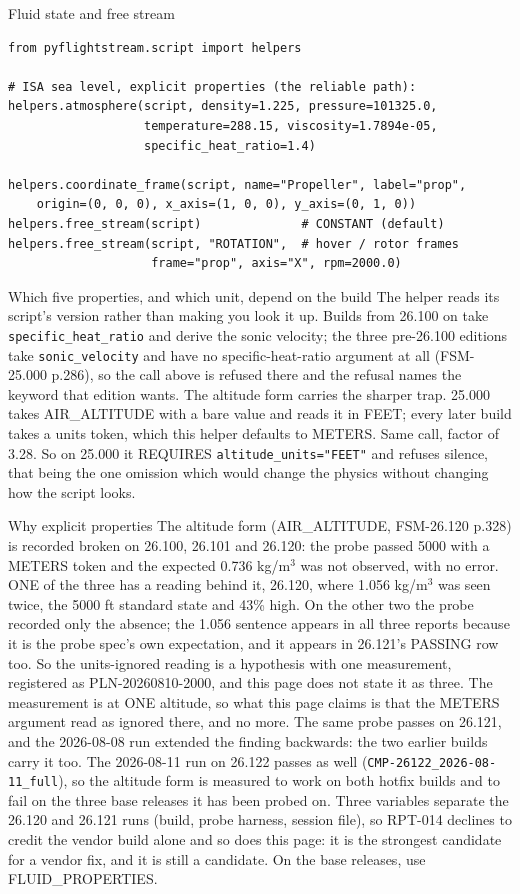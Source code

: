 \documentclass[aspectratio=169,10pt]{beamer}
\newcommand{\code}[1]{\texttt{\small #1}}
\begin{document}
\begin{frame}{Fluid state and free stream}
\begin{lstlisting}
from pyflightstream.script import helpers

# ISA sea level, explicit properties (the reliable path):
helpers.atmosphere(script, density=1.225, pressure=101325.0,
                   temperature=288.15, viscosity=1.7894e-05,
                   specific_heat_ratio=1.4)

helpers.coordinate_frame(script, name="Propeller", label="prop",
    origin=(0, 0, 0), x_axis=(1, 0, 0), y_axis=(0, 1, 0))
helpers.free_stream(script)              # CONSTANT (default)
helpers.free_stream(script, "ROTATION",  # hover / rotor frames
                    frame="prop", axis="X", rpm=2000.0)
\end{lstlisting}
  \begin{block}{Which five properties, and which unit, depend on the build}
    The helper reads its script's version rather than making you look it up. Builds from 26.100 on take \code{specific\_heat\_ratio} and derive the sonic velocity; the three pre-26.100 editions take \code{sonic\_velocity} and have no specific-heat-ratio argument at all (FSM-25.000 p.286), so the call above is refused there and the refusal names the keyword that edition wants.
    The altitude form carries the sharper trap. 25.000 takes AIR\_ALTITUDE with a bare value and reads it in FEET; every later build takes a units token, which this helper defaults to METERS. Same call, factor of 3.28. So on 25.000 it REQUIRES \code{altitude\_units="FEET"} and refuses silence, that being the one omission which would change the physics without changing how the script looks.
  \end{block}
  \begin{alertblock}{Why explicit properties}
    \small The altitude form (AIR\_ALTITUDE, FSM-26.120 p.328) is recorded broken on 26.100, 26.101 and 26.120: the probe passed 5000 with a METERS token and the expected 0.736 kg/m$^3$ was not observed, with no error. ONE of the three has a reading behind it, 26.120, where 1.056 kg/m$^3$ was seen twice, the 5000 ft standard state and 43\% high. On the other two the probe recorded only the absence; the 1.056 sentence appears in all three reports because it is the probe spec's own expectation, and it appears in 26.121's PASSING row too. So the units-ignored reading is a hypothesis with one measurement, registered as PLN-20260810-2000, and this page does not state it as three. The measurement is at ONE altitude, so what this page claims is that the METERS argument read as ignored there, and no more. The same probe passes on 26.121, and the 2026-08-08 run extended the finding backwards: the two earlier builds carry it too. The 2026-08-11 run on 26.122 passes as well (\code{CMP-26122\_2026-08-11\_full}), so the altitude form is measured to work on both hotfix builds and to fail on the three base releases it has been probed on. Three variables separate the 26.120 and 26.121 runs (build, probe harness, session file), so RPT-014 declines to credit the vendor build alone and so does this page: it is the strongest candidate for a vendor fix, and it is still a candidate. On the base releases, use FLUID\_PROPERTIES.

\end{alertblock}
\end{frame}
\end{document}
